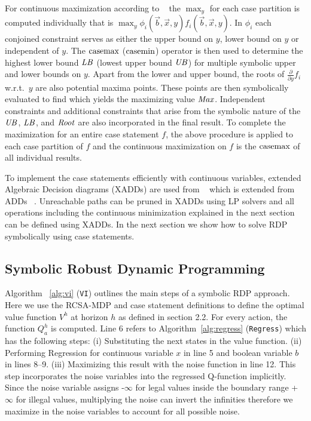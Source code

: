 For continuous maximization according to ~\cite{sdp_aaai} the $\max_y$ for each case partition
is computed individually that is $\max_y \phi_i(\vec{b},\vec{x},y) f_i(\vec{b},\vec{x},y)$.
In $\phi_i$ each conjoined constraint serves as either the upper bound on $y$, lower bound on $y$ or independent of $y$. The $\mathrm{casemax}$ ($\mathrm{casemin}$) operator is then used to determine the highest lower bound $\mathit{LB}$
(lowest upper bound $\mathit{UB}$) for multiple symbolic upper and lower bounds on $y$.
Apart from the lower and upper bound, the roots of $\frac{\partial}{\partial y} f_i$ 
w.r.t.\ $y$ are also potential maxima points. These points are then symbolically evaluated to find which yields the
maximizing value $\mathit{Max}$.  Independent constraints and additional constraints that arise from the
symbolic nature of the $\mathit{UB}$, $\mathit{LB}$, and $\mathit{Root}$ are also incorporated in the final result.
To complete the maximization for an entire case statement $f$, the
above procedure is applied to each case partition of $f$ and the continuous maximization on $f$ is the $\mathrm{casemax}$ of all individual results.  

To implement the case statements efficiently with continuous variables, extended Algebraic Decision diagrams (XADDs) are used from ~\cite{sanner_uai11} which is extended from ADDs ~\cite{bahar93add}. Unreachable paths can be pruned in XADDs using LP solvers and all operations including the continuous minimization explained in the next section can be defined using XADDs.
In the next section we show how to solve RDP symbolically using case statements.  


\subsection{Symbolic Robust Dynamic Programming}

Algorithm ~\ref{alg:vi} (\texttt{VI}) outlines the main steps of a symbolic RDP approach. Here we use the RCSA-MDP and case statement definitions to define the optimal value function $V^h$ at horizon $h$ as defined in section 2.2. 
For every action, the function $Q^h_a$ is computed. Line 6 refers to Algorithm~\ref{alg:regress}
(\texttt{Regress}) which has the following steps: 
(i) Substituting the next states in the value function.
(ii) Performing Regression for continuous variable $x$ in line 5 and boolean variable $b$ in lines 8--9.
(iii) Maximizing this result with the noise function in line 12. This step incorporates the noise variables into the regressed Q-function implicitly. Since the noise variable assigns -$\infty$ for legal values inside the boundary range +$\infty$ for illegal values, multiplying the noise can invert the infinities therefore we maximize in the noise variables to account for all possible noise. 

